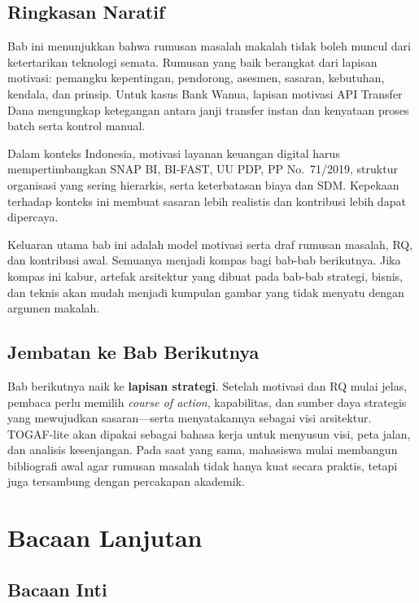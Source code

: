 \subsection*{Ringkasan Naratif}

Bab ini menunjukkan bahwa rumusan masalah makalah tidak boleh muncul dari
ketertarikan teknologi semata. Rumusan yang baik berangkat dari lapisan
motivasi: pemangku kepentingan, pendorong, asesmen, sasaran, kebutuhan, kendala,
dan prinsip. Untuk kasus Bank Wanua, lapisan motivasi API Transfer Dana
mengungkap ketegangan antara janji transfer instan dan kenyataan proses batch
serta kontrol manual.

Dalam konteks Indonesia, motivasi layanan keuangan digital harus
mempertimbangkan SNAP BI, BI-FAST, UU PDP, PP No.~71/2019, struktur organisasi
yang sering hierarkis, serta keterbatasan biaya dan SDM. Kepekaan terhadap
konteks ini membuat sasaran lebih realistis dan kontribusi lebih dapat
dipercaya.

Keluaran utama bab ini adalah model motivasi serta draf rumusan masalah, RQ,
dan kontribusi awal. Semuanya menjadi kompas bagi bab-bab berikutnya. Jika
kompas ini kabur, artefak arsitektur yang dibuat pada bab-bab strategi, bisnis,
dan teknis akan mudah menjadi kumpulan gambar yang tidak menyatu dengan argumen
makalah.

\subsection*{Jembatan ke Bab Berikutnya}

Bab berikutnya naik ke \textbf{lapisan strategi}. Setelah motivasi dan RQ mulai
jelas, pembaca perlu memilih \emph{course of action}, kapabilitas, dan sumber
daya strategis yang mewujudkan sasaran---serta menyatakannya sebagai visi
arsitektur. TOGAF-lite akan dipakai sebagai bahasa kerja untuk menyusun visi,
peta jalan, dan analisis kesenjangan. Pada saat yang sama, mahasiswa mulai
membangun bibliografi awal agar rumusan masalah tidak hanya kuat secara
praktis, tetapi juga tersambung dengan percakapan akademik.

\section{Bacaan Lanjutan}

\subsection*{Bacaan Inti}

